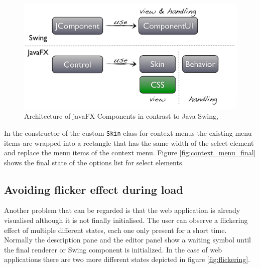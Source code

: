 \begin{figure}
	\centering \includegraphics[width=1.0\textwidth]{./img/impl/fx_components.png}
	\caption{Architecture of javaFX Components in contrast to Java Swing, \autocite{impl:fx-ui-controls}}
	\label{fig:fx-skinning}
\end{figure}

In the constructor of the custom \texttt{Skin} class for context menus the existing menu items are wrapped  into a rectangle that has the same width of the select element and replace the menu items of the context menu. 
Figure \ref{fig:context_menu_final} shows the final state of the options list for select elements.

\subsection{ Avoiding flicker effect during load}

Another problem that can be regarded is that the web application is already visualised although it is not finally initialised.
The user can observe a flickering effect of multiple different states, each one only present for a short time. 
Normally the description pane and the editor panel show a waiting symbol until the final renderer or Swing component is initialized. 
In the case of web applications there are two more different states depicted in figure \ref{fig:flickering}.

